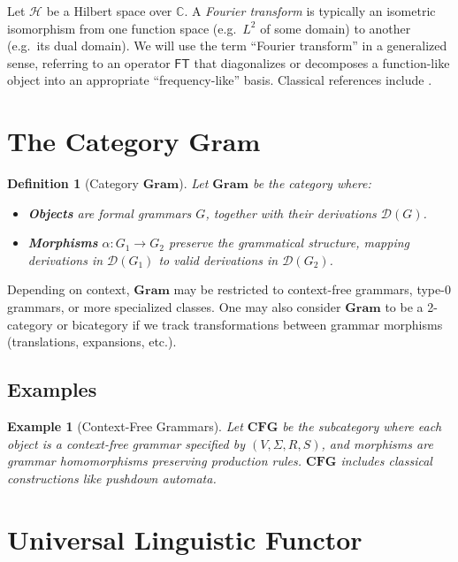 \documentclass[11pt]{article}
\newtheorem{definition}{Definition}[section]
\newtheorem{example}{Example}[section]
\begin{document}
Let \(\mathcal{H}\) be a Hilbert space over \(\mathbb{C}\). A \emph{Fourier transform} is typically an isometric isomorphism from one function space (e.g.\ \(L^2\) of some domain) to another (e.g.\ its dual domain). We will use the term ``Fourier transform'' in a generalized sense, referring to an operator \(\mathsf{FT}\) that diagonalizes or decomposes a function-like object into an appropriate ``frequency-like'' basis. Classical references include \cite{folland}.

\section{The Category \texorpdfstring{\(\mathbf{Gram}\)}{Gram}}

\begin{definition}[Category \(\mathbf{Gram}\)]
Let \(\mathbf{Gram}\) be the category where:
\begin{itemize}
    \item \textbf{Objects} are formal grammars \(G\), together with their derivations \(\mathcal{D}(G)\).
    \item \textbf{Morphisms} \(\alpha : G_1 \to G_2\) preserve the grammatical structure, mapping derivations in \(\mathcal{D}(G_1)\) to valid derivations in \(\mathcal{D}(G_2)\).
\end{itemize}
\end{definition}

Depending on context, \(\mathbf{Gram}\) may be restricted to context-free grammars, type-0 grammars, or more specialized classes. One may also consider \(\mathbf{Gram}\) to be a 2-category or bicategory if we track transformations between grammar morphisms (translations, expansions, etc.).

\subsection{Examples}

\begin{example}[Context-Free Grammars]
Let \(\mathbf{CFG}\) be the subcategory where each object is a context-free grammar specified by \((V, \Sigma, R, S)\), and morphisms are grammar homomorphisms preserving production rules. \(\mathbf{CFG}\) includes classical constructions like pushdown automata.
\end{example}

\section{Universal Linguistic Functor}
\end{document}
